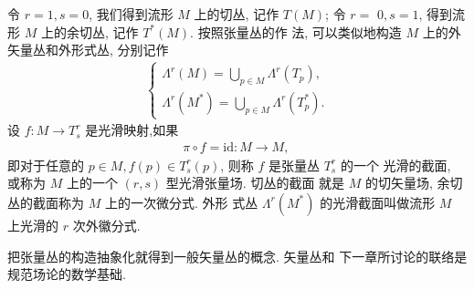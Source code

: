 令 $r=1, s=0$, 我们得到流形 $M$ 上的切丛, 记作 $T(M)$; 令 $r=$ $0, s=1$, 得到流形 $M$ 上的余切丛, 记作 $T^*(M)$. 按照张量丛的作 法, 可以类似地构造 $M$ 上的外矢量丛和外形式丛, 分别记作
\begin{align*}
\left\{\begin{array}{l}
\Lambda^r(M)=\bigcup_{p \in M} \Lambda^r\left(T_p\right), \\
\Lambda^r\left(M^*\right)=\bigcup_{p \in M} \Lambda^r\left(T_p^*\right) .
\end{array}\right.
\end{align*}
设 $f: M \rightarrow T_s^r$ 是光滑映射,如果
\begin{align*}
\pi \circ f=\mathrm{id}: M \rightarrow M \text {, }
\end{align*}
即对于任意的 $p \in M, f(p) \in T_s^r(p)$, 则称 $f$ 是张量丛 $T_s^r$ 的一个
光滑的截面, 或称为 $M$ 上的一个 $(r, s)$ 型光滑张量场. 切丛的截面 就是 $M$ 的切矢量场, 余切丛的截面称为 $M$ 上的一次微分式. 外形 式丛 $\Lambda^r\left(M^*\right)$ 的光滑截面叫做流形 $M$ 上光滑的 $r$ 次外徽分式.

把张量丛的构造抽象化就得到一般矢量丛的概念. 矢量丛和 下一章所讨论的联络是规范场论的数学基础.

